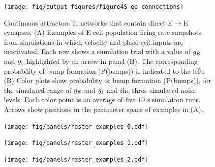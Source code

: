 \documentclass[a4paper,12pt]{article}
\newcommand{\ssc}[3]{\ensuremath{#1_{\text{#2}_{\text{#3}}}}}
\newcommand{\gE      }{\ssc{g}      {\scriptsize{E}}{}}
\newcommand{\gI      }{\ssc{g}      {\scriptsize{I}}{}}
\begin{document}
\clearpage

%

\begin{figure}[p]
    \internallinenumbers
    \centering
        \texttt{[image: fig/output\_figures/figure4S\_ee\_connections]}
    \caption{Continuous attractors in networks that contain direct
    E$\rightarrow$E synapses. (A) Examples of E cell population firing rate
    snapshots from simulations in which velocity and place cell inputs are
    inactivated. Each row shows a simulation trial with a value of $\gE$ and
    $\gI$
    highlighted by an arrow in panel (B). The corresponding probability of bump
    formation (P(bumps)) is indicated to the left.  (B) Color plots show
    probability of bump formation (P(bumps)), for the simulated range of $\gE$ and
    $\gI$ and the three simulated noise levels. Each color point is an average of
    five 10 s simulation runs. Arrows show positions in the parameter space of
    examples in (A).}
\end{figure}

\clearpage

\begin{figure}[p]
    \centering
        \texttt{[image: fig/panels/raster\_examples\_0.pdf]}
\end{figure}

\begin{figure}[p]
    \centering
        \texttt{[image: fig/panels/raster\_examples\_1.pdf]}
\end{figure}

\begin{figure}[p]
    \centering
        \texttt{[image: fig/panels/raster\_examples\_2.pdf]}
\end{figure}
\end{document}
